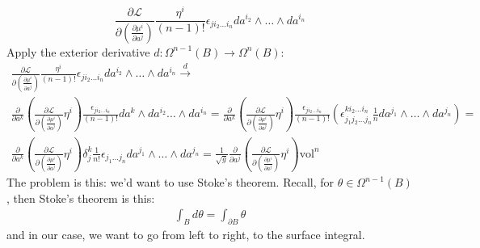 \documentclass[twoside,landscape,10pt]{amsart}
\theoremstyle{plain}
\theoremstyle{definition}
\theoremstyle{remark}
\begin{document}
\begin{multicols*}{2}
\[
\frac{ \partial \mathcal{L}}{ \partial \left( \frac{ \partial \mu^i}{ \partial a^j} \right) } \frac{ \eta^i}{ (n-1)!} \epsilon_{ji_2 \dots i_n} da^{i_2} \wedge \dots \wedge da^{i_n}
\]
Apply the exterior derivative $d:\Omega^{n-1}(B) \to \Omega^n(B)$:
\[
\begin{gathered}
  \frac{ \partial \mathcal{L}}{ \partial \left( \frac{ \partial \mu^i}{ \partial a^j} \right) } \frac{ \eta^i}{ (n-1)!} \epsilon_{ji_2 \dots i_n} da^{i_2} \wedge \dots \wedge da^{i_n} \xrightarrow{d} \\
  \frac{ \partial }{ \partial a^k} \left( \frac{ \partial \mathcal{L}}{ \partial \left( \frac{ \partial \mu^i}{ \partial a^j} \right) } \eta^i \right) \frac{ \epsilon_{ji_2 \dots i_n} }{(n-1)!} da^k \wedge da^{i_2} \dots \wedge da^{i_n} =   \frac{ \partial }{ \partial a^k} \left( \frac{ \partial \mathcal{L}}{ \partial \left( \frac{ \partial \mu^i}{ \partial a^j} \right) } \eta^i \right) \frac{ \epsilon_{ji_2 \dots i_n} }{(n-1)!} ( \epsilon^{ki_2 \dots i_n}_{j_1j_2\dots j_n} \frac{1}{n} da^{j_1} \wedge \dots \wedge da^{j_n} ) = \\
  \frac{ \partial }{ \partial a^k} \left( \frac{ \partial \mathcal{L}}{ \partial \left( \frac{ \partial \mu^i}{ \partial a^j} \right) } \eta^i \right) \delta^k_j \frac{1}{n!} \epsilon_{j_1 \dots j_n} da^{j_1} \wedge \dots \wedge da^{j_n} = \frac{1}{\sqrt{g}} \frac{ \partial }{ \partial a^j} \left( \frac{ \partial \mathcal{L}}{ \partial \left( \frac{ \partial \mu^i}{ \partial a^j} \right) }   \eta^i \right)\text{vol}^n
\end{gathered}
\]
The problem is this: we'd want to use Stoke's theorem.  Recall, for $\theta \in \Omega^{n-1}(B)$, then Stoke's theorem is this:
\[
\begin{gathered}
\int_B d\theta = \int_{\partial B} \theta
\end{gathered}
\]
and in our case, we want to go from left to right, to the surface integral.  


\end{multicols*}
\end{document}
